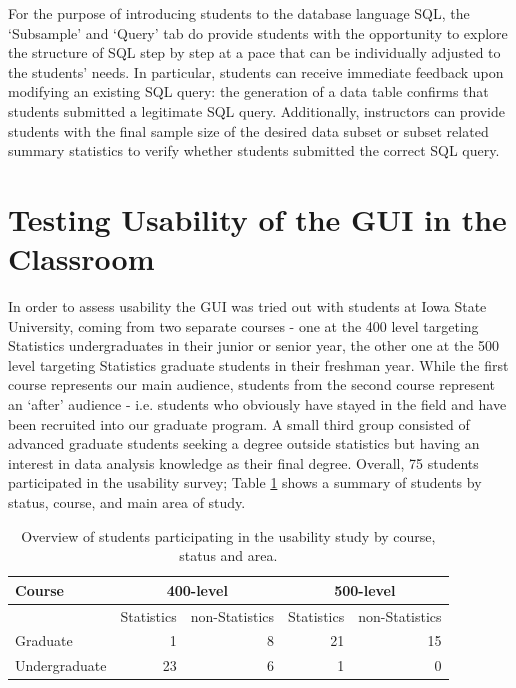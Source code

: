 \documentclass[11pt]{tise_style}
\begin{document}
For the purpose of introducing students to the database language SQL, the `Subsample' and `Query' tab do provide students with the opportunity to explore the structure of SQL step by step at a pace that can be individually adjusted to the students' needs. In particular, students can receive immediate feedback upon modifying an existing SQL query: the generation of a data table confirms that students submitted a legitimate SQL query. Additionally, instructors can provide students with the final sample size of the desired data subset or subset related summary statistics to verify whether students submitted the correct SQL query.      


\section{Testing Usability of the GUI in the Classroom}
\label{implement}
In order to assess usability the GUI was tried out with students at Iowa State University, coming from two separate courses - one at the 400 level targeting Statistics undergraduates in their junior or senior year, the other one at the 500 level targeting Statistics graduate students in their freshman year. While the first course represents  our main audience, students from the second course represent an `after' audience - i.e. students who obviously have stayed in the field and have been recruited into our graduate program.  A small third group consisted of advanced graduate students seeking a degree outside statistics but having an interest in data analysis knowledge as their final degree.  Overall, 75 students participated in the usability survey; Table \ref{fb-overview} shows a summary of students by status, course, and main area of study. 

\begin{table}[htbp]
   \centering
   \begin{tabular}{lrrrr} %
      \toprule
	Course  & \multicolumn{2}{c}{400-level} & \multicolumn{2}{c}{500-level} \\
      \midrule
      & Statistics & non-Statistics       & Statistics & non-Statistics \\
       \cmidrule(l){2-5}
      Graduate & 1 & 8 & 21 & 15 \\
      Undergraduate & 23 & 6 & 1 & 0 \\
      \bottomrule
   \end{tabular}
   \caption{Overview of students participating in the usability study by course, status and area.}
   \label{fb-overview}
\end{table}
\end{document}
